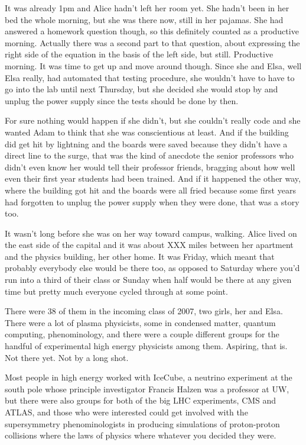 \mymark

It was already 1pm and Alice hadn't left her room yet. She hadn't been in her bed the whole morning, but she was there now, still in her pajamas. She had answered a homework question though, so this definitely counted as a productive morning. Actually there was a second part to that question, about expressing the right side of the equation in the basis of the left side, but still. Productive morning. It was time to get up and move around though. Since she and Elsa, well Elsa really, had automated that testing procedure, she wouldn't have to have to go into the lab until next Thursday, but she decided she would stop by    and unplug the power supply since the tests should be done by then. 

For sure nothing would happen if she didn't, but she couldn't really code and she wanted Adam to think that she was conscientious at least. And if the building did get hit by lightning and the boards were saved because they didn't have a direct line to the surge, that was the kind of anecdote the senior professors who didn't even know her would tell their professor friends, bragging about how well even their first year students had been trained. And if it happened the other way, where the building got hit and the boards were all fried because some first years had forgotten to unplug the power supply when they were done, that was a story too.

\mypause

It wasn't long before she was on her way toward campus, walking. Alice lived on the east side of the capital and it was about XXX miles between her apartment and the physics building, her other home. It was Friday, which meant that probably everybody else would be there too, as opposed to Saturday where you'd run into a third of their class or Sunday when half would be there at any given time but pretty much everyone cycled through at some point. 

There were 38 of them in the incoming class of 2007, two girls, her and Elsa. There were a lot of plasma physicists, some in condensed matter, quantum computing, phenominology, and there were a couple different groups for the handful of experimental high energy physicists among them. Aspiring, that is. Not there yet. Not by a long shot. 

Most people in high energy worked with IceCube, a neutrino experiment at the south pole whose principle investigator Francis Halzen was a professor at UW, but there were also groups for both of the big LHC experiments, CMS and ATLAS, and those who were interested could get involved with the supersymmetry phenominologists in producing simulations of proton-proton collisions where the laws of physics where whatever you decided they were.

